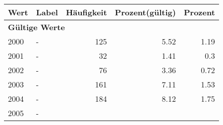      \begin{longtable}{lXrrr}
     \toprule
     \textbf{Wert} & \textbf{Label} & \textbf{Häufigkeit} & \textbf{Prozent(gültig)} & \textbf{Prozent} \\
     \endhead
     \midrule
     \multicolumn{5}{l}{\textbf{Gültige Werte}}\\

     2000 &
     \multicolumn{1}{X}{ -  } &


       \num{125} &
       \num[round-mode=places,round-precision=2]{5,52} &
         \num[round-mode=places,round-precision=2]{1,19} \\

     2001 &
     \multicolumn{1}{X}{ -  } &


       \num{32} &
       \num[round-mode=places,round-precision=2]{1,41} &
         \num[round-mode=places,round-precision=2]{0,3} \\

     2002 &
     \multicolumn{1}{X}{ -  } &


       \num{76} &
       \num[round-mode=places,round-precision=2]{3,36} &
         \num[round-mode=places,round-precision=2]{0,72} \\

     2003 &
     \multicolumn{1}{X}{ -  } &


       \num{161} &
       \num[round-mode=places,round-precision=2]{7,11} &
         \num[round-mode=places,round-precision=2]{1,53} \\

     2004 &
     \multicolumn{1}{X}{ -  } &


       \num{184} &
       \num[round-mode=places,round-precision=2]{8,12} &
         \num[round-mode=places,round-precision=2]{1,75} \\

     2005 &
     \multicolumn{1}{X}{ -  } &



\end{longtable}
